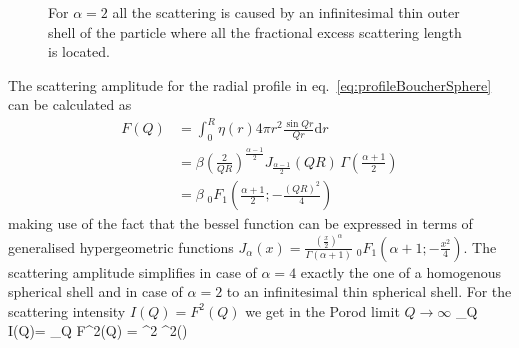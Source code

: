 \begin{figure}[htb]
\begin{center}
\hfill
{}
\end{center}
\caption{For $\alpha=2$ all the scattering is caused by an infinitesimal thin outer shell of the particle where all the fractional excess scattering length is located.}
\label{fig:BoucherZr}
\end{figure}

The scattering amplitude for the radial profile in eq.\ \ref{eq:profileBoucherSphere} can be calculated as
\begin{align}
 F(Q) &= \int_0^R \eta(r) 4\pi r^2 \frac{\sin Qr}{Qr}\mathrm{d}r \nonumber \\
      &= \beta \left(\frac{2}{QR}\right)^{\frac{\alpha-1}{2}} J_{\frac{\alpha-1}{2}}(QR) \, \Gamma\left(\frac{\alpha+1}{2}\right) \nonumber \\
      &= \beta \;_0F_1\left(\frac{\alpha+1}{2};-\tfrac{(QR)^2}{4}\right)
\end{align}
making use of the fact that the bessel function can be expressed in terms of generalised hypergeometric functions $J_\alpha(x)=\frac{(\frac{x}{2})^\alpha}{\Gamma(\alpha+1)}  \;_0F_1 (\alpha+1; -\tfrac{x^2}{4})$. The scattering amplitude simplifies in case of $\alpha=4$ exactly the one of a homogenous spherical shell and in case of $\alpha=2$ to an infinitesimal thin spherical shell. For the scattering intensity $I(Q) = F^2(Q)$ we get in the Porod limit $Q\rightarrow\infty$
\BE
 \lim_{Q\rightarrow\infty} I(Q)= \lim_{Q\rightarrow\infty}  F^2(Q) =
 \beta^2  \Gamma^2\left(\right) 
\EE

